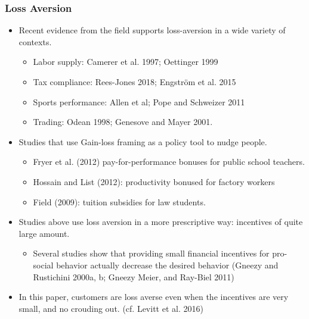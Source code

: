 \documentclass[dvipdfmx,11pt]{beamer}
\begin{document}
\begin{frame}\frametitle{Loss Aversion}
  \begin{itemize}
    \item Recent evidence from the field supports loss-aversion in a wide variety of contexts.
    \begin{itemize}
      \item Labor supply: Camerer et al. 1997; Oettinger 1999
      \item Tax compliance: Rees-Jones 2018; Engstr\"{o}m et al. 2015
      \item Sports performance: Allen et al; Pope and Schweizer 2011
      \item Trading: Odean 1998; Genesove and Mayer 2001.
    \end{itemize}
    \item Studies that use Gain-loss framing as a policy tool to nudge people.
    \begin{itemize}
      \item Fryer et al. (2012) pay-for-performance bonuses for public school teachers.
      \item Hossain and List (2012): productivity bonused for factory workers
      \item Field (2009): tuition subsidies for law students.
    \end{itemize}
    \item Studies above use loss aversion in a more prescriptive way: incentives of quite large amount.
    \begin{itemize}
      \item Several studies show that providing small financial incentives for pro-social behavior actually decrease the desired behavior (Gneezy and Rustichini 2000a, b; Gneezy Meier, and Ray-Biel 2011)
    \end{itemize}
    \item In this paper, customers are loss averse even when the incentives are very small, and no crouding out. (cf. Levitt et al. 2016)
  \end{itemize}
\end{frame}
\end{document}
